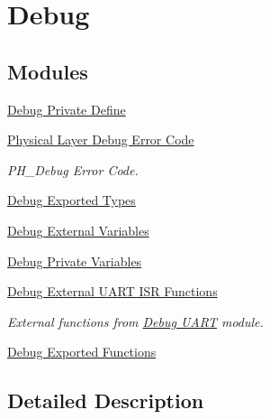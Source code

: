 \hypertarget{group___debug}{}\section{Debug}
\label{group___debug}
\subsection*{Modules}
\begin{DoxyCompactItemize}
\item 
\hyperlink{group___debug___private___define}{Debug Private Define}
\item 
\hyperlink{group___p_h___debug___error___code}{Physical Layer Debug Error Code}
\begin{DoxyCompactList}\small\item\em P\+H\+\_\+\+Debug Error Code. \end{DoxyCompactList}\item 
\hyperlink{group___debug___exported___types}{Debug Exported Types}
\item 
\hyperlink{group___debug___external___variables}{Debug External Variables}
\item 
\hyperlink{group___debug___private___variables}{Debug Private Variables}
\item 
\hyperlink{group___debug___external___functions}{Debug External U\+A\+R\+T I\+S\+R Functions}
\begin{DoxyCompactList}\small\item\em External functions from \hyperlink{group___debug___uart}{Debug U\+A\+RT} module. \end{DoxyCompactList}\item 
\hyperlink{group___debug___exported___functions}{Debug Exported Functions}
\end{DoxyCompactItemize}


\subsection{Detailed Description}
